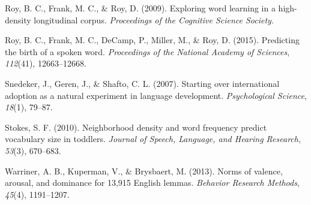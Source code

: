\documentclass[10pt, letterpaper]{article}
\begin{document}
Roy, B. C., Frank, M. C., \& Roy, D. (2009). Exploring word learning in
a high-density longitudinal corpus. \emph{Proceedings of the Cognitive
Science Society}.

Roy, B. C., Frank, M. C., DeCamp, P., Miller, M., \& Roy, D. (2015).
Predicting the birth of a spoken word. \emph{Proceedings of the National
Academy of Sciences}, \emph{112}(41), 12663--12668.

Snedeker, J., Geren, J., \& Shafto, C. L. (2007). Starting over
international adoption as a natural experiment in language development.
\emph{Psychological Science}, \emph{18}(1), 79--87.

Stokes, S. F. (2010). Neighborhood density and word frequency predict
vocabulary size in toddlers. \emph{Journal of Speech, Language, and
Hearing Research}, \emph{53}(3), 670--683.

Warriner, A. B., Kuperman, V., \& Brysbaert, M. (2013). Norms of
valence, arousal, and dominance for 13,915 English lemmas.
\emph{Behavior Research Methods}, \emph{45}(4), 1191--1207.
\end{document}

